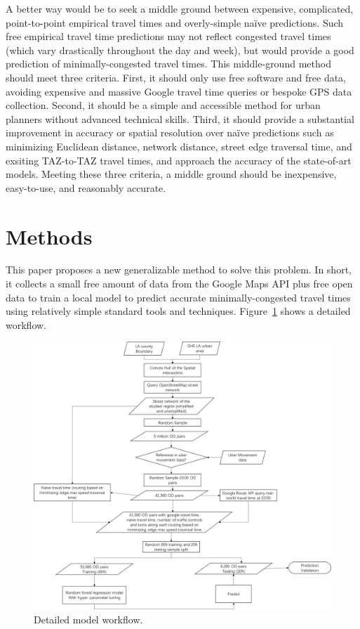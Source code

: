 \documentclass[12pt,letterpaper]{article} %
\begin{document}
    A better way would be to seek a middle ground between expensive, complicated, point-to-point empirical travel times and overly-simple naïve predictions. Such free empirical travel time predictions may not reflect congested travel times (which vary drastically throughout the day and week), but would provide a good prediction of minimally-congested travel times. This middle-ground method should meet three criteria. First, it should only use free software and free data, avoiding expensive and massive Google travel time queries or bespoke GPS data collection. Second, it should be a simple and accessible method for urban planners without advanced technical skills. Third, it should provide a substantial improvement in accuracy or spatial resolution over naïve predictions such as minimizing Euclidean distance, network distance, street edge traversal time, and exsiting TAZ-to-TAZ travel times, and approach the accuracy of the state-of-art models. Meeting these three criteria, a middle ground should be inexpensive, easy-to-use, and reasonably accurate.


    \section{Methods}

    This paper proposes a new generalizable method to solve this problem. In short, it collects a small free amount of data from the Google Maps API plus free open data to train a local model to predict accurate minimally-congested travel times using relatively simple standard tools and techniques. Figure~\ref{fig:workflow} shows a detailed workflow.

    \begin{figure}[hbt!]
        \centering
        \includegraphics[width=1.0\textwidth]{fig_workflow.jpg}
        \caption{Detailed model workflow.}\label{fig:workflow}
    \end{figure}
\end{document}
